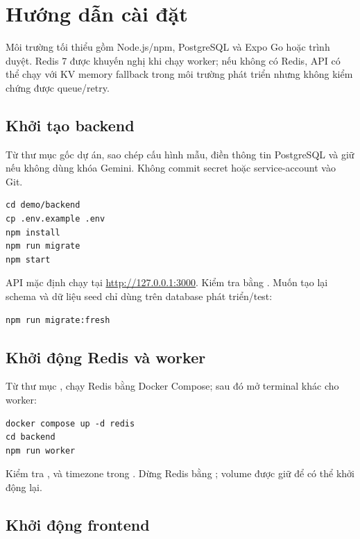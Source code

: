 \appendix
\startappendixpages

\chapter{Hướng dẫn cài đặt}

Môi trường tối thiểu gồm Node.js/npm, PostgreSQL và Expo Go hoặc trình duyệt. Redis 7 được khuyến nghị khi chạy worker; nếu không có Redis, API có thể chạy với KV memory fallback trong môi trường phát triển nhưng không kiểm chứng được queue/retry.

\section{Khởi tạo backend}

Từ thư mục gốc dự án, sao chép cấu hình mẫu, điền thông tin PostgreSQL và giữ  nếu không dùng khóa Gemini. Không commit secret hoặc service-account vào Git.

\begin{verbatim}
cd demo/backend
cp .env.example .env
npm install
npm run migrate
npm start
\end{verbatim}

API mặc định chạy tại \url{http://127.0.0.1:3000}. Kiểm tra bằng . Muốn tạo lại schema và dữ liệu seed chỉ dùng trên database phát triển/test:

\begin{verbatim}
npm run migrate:fresh
\end{verbatim}

\section{Khởi động Redis và worker}

Từ thư mục , chạy Redis bằng Docker Compose; sau đó mở terminal khác cho worker:

\begin{verbatim}
docker compose up -d redis
cd backend
npm run worker
\end{verbatim}

Kiểm tra ,  và timezone trong . Dừng Redis bằng ; volume được giữ để có thể khởi động lại.

\section{Khởi động frontend}

